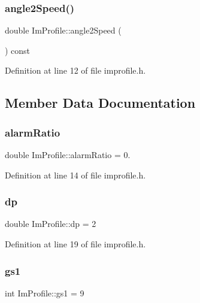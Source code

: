 \subsubsection{\texorpdfstring{angle2\+Speed()}{angle2Speed()}}
{\footnotesize\ttfamily double Im\+Profile\+::angle2\+Speed (\begin{DoxyParamCaption}{ }\end{DoxyParamCaption}) const\hspace{0.3cm}{\ttfamily [inline]}}



Definition at line 12 of file improfile.\+h.



\subsection{Member Data Documentation}
\mbox{\label{struct_im_profile_ae22af95683de6b6f10bac5e3b8ed01b4}} 
\subsubsection{\texorpdfstring{alarm\+Ratio}{alarmRatio}}
{\footnotesize\ttfamily double Im\+Profile\+::alarm\+Ratio = 0.}



Definition at line 14 of file improfile.\+h.

\mbox{\label{struct_im_profile_ae9a7b67e92d0dd3a829a25edd34fbde8}} 
\subsubsection{\texorpdfstring{dp}{dp}}
{\footnotesize\ttfamily double Im\+Profile\+::dp = 2}



Definition at line 19 of file improfile.\+h.

\mbox{\label{struct_im_profile_a9fa1622579348c3d0dccebe11c205a29}} 
\subsubsection{\texorpdfstring{gs1}{gs1}}
{\footnotesize\ttfamily int Im\+Profile\+::gs1 = 9}



